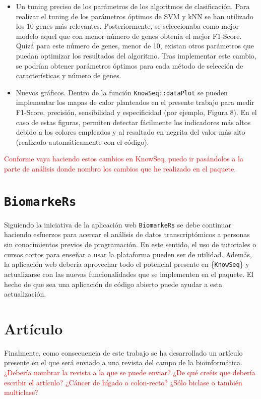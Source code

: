 \begin{itemize}
	\item Un tuning preciso de los parámetros de los algoritmos de clasificación. Para realizar el tuning de los parámetros óptimos de SVM y kNN se han utilizado los 10 genes más relevantes. Posteriormente, se seleccionaba como mejor modelo aquel que con menor número de genes obtenía el mejor F1-Score. Quizá para este número de genes, menor de 10, existan otros parámetros que puedan optimizar los resultados del algoritmo. Tras implementar este cambio, se podrían obtener parámetros óptimos para cada método de selección de características y número de genes.
		\item Nuevos gráficos. Dentro de la función \texttt{KnowSeq::dataPlot} se pueden implementar los mapas de calor planteados en el presente trabajo para medir F1-Score, precisión, sensibilidad y especificidad (por ejemplo, Figura 8). En el caso de estas figuras, permiten detectar fácilmente los indicadores más altos debido a los colores empleados y al resaltado en negrita del valor más alto (realizado automáticamente con el código).
\end{itemize}

\textcolor{red}{Conforme vaya haciendo estos cambios en KnowSeq, puedo ir pasándolos a la parte de análisis donde nombro los cambios que he realizado en el paquete.}\\

\section{\texttt{BiomarkeRs}}

Siguiendo la iniciativa de la aplicación web \texttt{BiomarkeRs} se debe continuar haciendo esfuerzos para acercar el análisis de datos transcriptómicos a personas sin conocimientos previos de programación. En este sentido, el uso de tutoriales o cursos cortos para enseñar a usar la plataforma pueden ser de utilidad. Además, la aplicación web debería aprovechar todo el potencial presente en \{\texttt{KnowSeq}\} y actualizarse con las nuevas funcionalidades que se implementen en el paquete. El hecho de que sea una aplicación de código abierto puede ayudar a esta actualización. \\

\section{Artículo}

Finalmente, como consecuencia de este trabajo se ha desarrollado un artículo presente en el  que será enviado a una revista del campo de la bioinformática. \textcolor{red}{¿Debería nombrar la revista a la que se puede enviar? ¿De qué creéis que debería escribir el artículo? ¿Cáncer de hígado o colon-recto? ¿Sólo biclase o también multiclase?}




